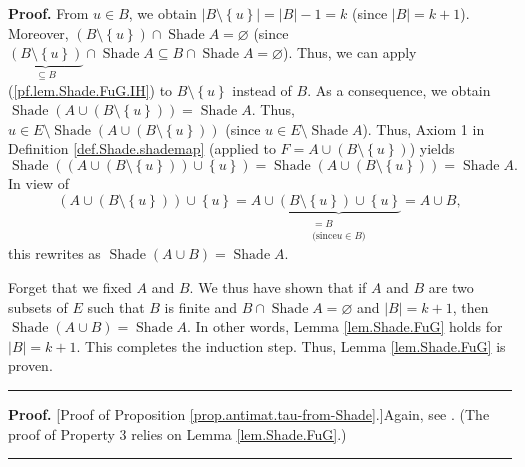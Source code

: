\documentclass[numbers=enddot,12pt,final,onecolumn]{scrartcl}%
\theoremstyle{definition}
\newenvironment{proof}[1][Proof]{\noindent\textbf{#1.} }{\ \rule{0.5em}{0.5em}}
\newenvironment{verlong}{}{}
\newenvironment{vershort}{}{}
\begin{document}
\begin{verlong}
\begin{proof}
From $u\in B$, we obtain $\left\vert B\setminus\left\{  u\right\}  \right\vert
=\left\vert B\right\vert -1=k$ (since $\left\vert B\right\vert =k+1$).
Moreover, $\left(  B\setminus\left\{  u\right\}  \right)  \cap
\operatorname*{Shade}A=\varnothing$ (since $\underbrace{\left(  B\setminus
\left\{  u\right\}  \right)  }_{\subseteq B}\cap\operatorname*{Shade}%
A\subseteq B\cap\operatorname*{Shade}A=\varnothing$). Thus, we can apply
(\ref{pf.lem.Shade.FuG.IH}) to $B\setminus\left\{  u\right\}  $ instead of
$B$. As a consequence, we obtain $\operatorname*{Shade}\left(  A\cup\left(
B\setminus\left\{  u\right\}  \right)  \right)  =\operatorname*{Shade}A$.
Thus, $u\in E\setminus\operatorname*{Shade}\left(  A\cup\left(  B\setminus
\left\{  u\right\}  \right)  \right)  $ (since $u\in E\setminus
\operatorname*{Shade}A$). Thus, Axiom 1 in Definition \ref{def.Shade.shademap}
(applied to $F=A\cup\left(  B\setminus\left\{  u\right\}  \right)  $) yields
\[
\operatorname*{Shade}\left(  \left(  A\cup\left(  B\setminus\left\{
u\right\}  \right)  \right)  \cup\left\{  u\right\}  \right)
=\operatorname*{Shade}\left(  A\cup\left(  B\setminus\left\{  u\right\}
\right)  \right)  =\operatorname*{Shade}A.
\]
In view of
\[
\left(  A\cup\left(  B\setminus\left\{  u\right\}  \right)  \right)
\cup\left\{  u\right\}  =A\cup\underbrace{\left(  B\setminus\left\{
u\right\}  \right)  \cup\left\{  u\right\}  }_{\substack{=B\\\text{(since
}u\in B\text{)}}}=A\cup B,
\]
this rewrites as $\operatorname*{Shade}\left(  A\cup B\right)
=\operatorname*{Shade}A$.

Forget that we fixed $A$ and $B$. We thus have shown that if $A$ and $B$ are
two subsets of $E$ such that $B$ is finite and $B\cap\operatorname*{Shade}%
A=\varnothing$ and $\left\vert B\right\vert =k+1$, then $\operatorname*{Shade}%
\left(  A\cup B\right)  =\operatorname*{Shade}A$. In other words, Lemma
\ref{lem.Shade.FuG} holds for $\left\vert B\right\vert =k+1$. This completes
the induction step. Thus, Lemma \ref{lem.Shade.FuG} is proven.
\end{proof}
\end{verlong}

\begin{vershort}


\begin{proof}
[Proof of Proposition \ref{prop.antimat.tau-from-Shade}.]Again, see
\cite{verlong}. (The proof of Property 3 relies on Lemma \ref{lem.Shade.FuG}.)
\end{proof}
\end{vershort}
\end{document}
